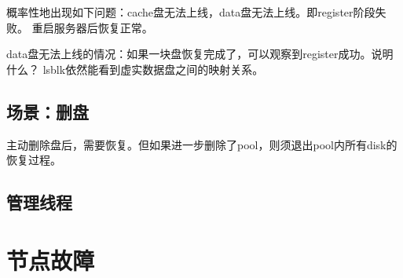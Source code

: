 概率性地出现如下问题：cache盘无法上线，data盘无法上线。即register阶段失败。
重启服务器后恢复正常。

data盘无法上线的情况：如果一块盘恢复完成了，可以观察到register成功。说明什么？
lsblk依然能看到虚实数据盘之间的映射关系。

\subsection{场景：删盘}

主动删除盘后，需要恢复。但如果进一步删除了pool，则须退出pool内所有disk的恢复过程。

\subsection{管理线程}

\section{节点故障}
